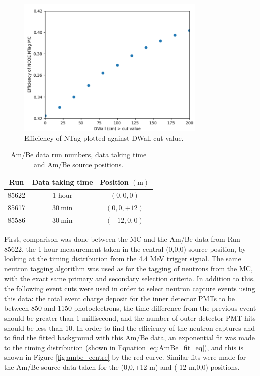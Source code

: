\begin{figure}
    \centering
    \includegraphics[width=0.8\textwidth]{Figures/efficiency_dwall.png}
    \caption{Efficiency of NTag plotted against DWall cut value.}
    \label{fig:efficiency_dwall}
\end{figure}


\begin{table}
    \centering
    \begin{tabular}{||c|c|c||}
        \hline Run & Data taking time & Position $(\mathrm{m})$ \\
        \hline 85622 & 1 hour & $(0,0,0)$ \\
        \hline 85617 & $30 \mathrm{~min}$ & $(0,0,+12)$ \\
        \hline 85586 & $30 \mathrm{~min}$ & $(-12,0,0)$ \\
        \hline
        \end{tabular}
    \caption{Am/Be data run numbers, data taking time and Am/Be source positions.}
    \label{table:ambe_positions}
\end{table}

First, comparison was done between the MC and the Am/Be data from Run 85622, the 1 hour measurement taken in the central (0,0,0) source position, by looking at the timing distribution from the 4.4 MeV trigger signal. The same neutron tagging algorithm was used as for the tagging of neutrons from the MC, with the exact same primary and secondary selection criteria. In addition to this, the following event cuts were used in order to select neutron capture events using this data: the total event charge deposit for the inner detector PMTs to be between 850 and 1150 photoelectrons, the time difference from the previous event should be greater than 1 millisecond, and the number of outer detector PMT hits should be less than 10. In order to find the efficiency of the neutron captures and to find the fitted background with this Am/Be data, an exponential fit was made to the timing distribution (shown in Equation \ref{eq:AmBe_fit_eq}), and this is shown in Figure \ref{fig:ambe_centre} by the red curve. Similar fits were made for the Am/Be source data taken for the (0,0,+12 m) and (-12 m,0,0) positions. 


